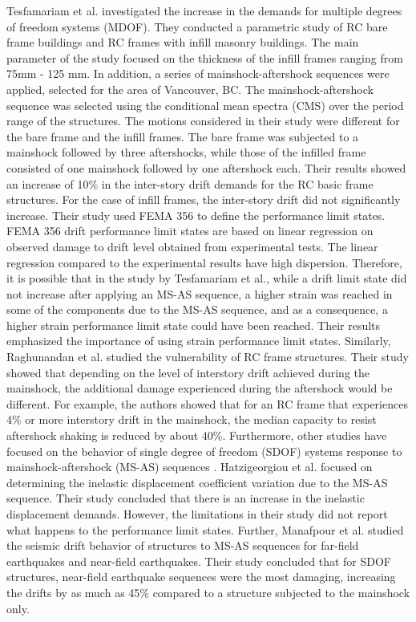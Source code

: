 Tesfamariam et al. \cite{Tesfamariam2015} investigated the increase in the demands for multiple degrees of freedom systems (MDOF). They conducted a parametric study of RC bare frame buildings and RC frames with infill masonry buildings. The main parameter of the study focused on the thickness of the infill frames ranging from 75mm - 125 mm. In addition, a series of mainshock-aftershock sequences were applied, selected for the area of Vancouver, BC. The mainshock-aftershock sequence was selected using the conditional mean spectra (CMS) over the period range of the structures. The motions considered in their study were different for the bare frame and the infill frames. The bare frame was subjected to a mainshock followed by three aftershocks, while those of the infilled frame consisted of one mainshock followed by one aftershock each. Their results showed an increase of 10\% in the inter-story drift demands for the RC basic frame structures. For the case of infill frames, the inter-story drift did not significantly increase. Their study used FEMA 356 \cite{FEMA2000} to define the performance limit states. FEMA 356 drift performance limit states are based on linear regression on observed damage to drift level obtained from experimental tests. The linear regression compared to the experimental results have high dispersion. Therefore, it is possible that in the study by Tesfamariam et al., while a drift limit state did not increase after applying an MS-AS sequence, a higher strain was reached in some of the components due to the MS-AS sequence, and as a consequence, a higher strain performance limit state could have been reached. Their results emphasized the importance of using strain performance limit states.
Similarly, Raghunandan et al. \cite{Raghunandan2015} studied the vulnerability of RC frame structures. Their study showed that depending on the level of interstory drift achieved during the mainshock, the additional damage experienced during the aftershock would be different. For example, the authors showed that for an RC frame that experiences 4\% or more interstory drift in the mainshock, the median capacity to resist aftershock shaking is reduced by about 40\%. Furthermore, other studies have focused on the behavior of single degree of freedom (SDOF) systems response to mainshock-aftershock (MS-AS) sequences \cite{Hatzigeorgiou2009}\cite{Manafpour2019}. Hatzigeorgiou et al. focused on determining the inelastic displacement coefficient variation due to the MS-AS sequence. Their study concluded that there is an increase in the inelastic displacement demands. However, the limitations in their study did not report what happens to the performance limit states. Further, Manafpour et al. studied the seismic drift behavior of structures to MS-AS sequences for far-field earthquakes and near-field earthquakes. Their study concluded that for SDOF structures, near-field earthquake sequences were the most damaging, increasing the drifts by as much as 45\% compared to a structure subjected to the mainshock only.

